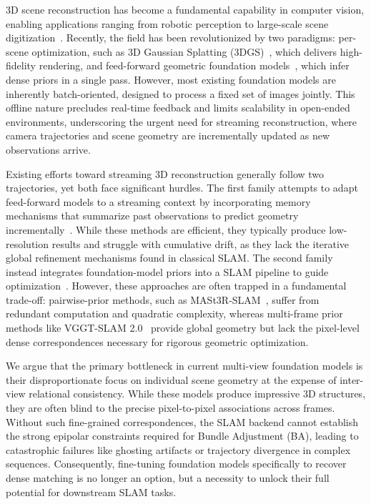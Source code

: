 3D scene reconstruction has become a fundamental capability in computer vision, enabling applications ranging from robotic perception to large-scale scene digitization~\cite{zhou2025hugsim,huang2026soma,yu2026gaussexplorer,yang2025novel}. Recently, the field has been revolutionized by two paradigms: per-scene optimization, such as 3D Gaussian Splatting (3DGS)~\cite{kerbl20233d}, which delivers high-fidelity rendering, and feed-forward geometric foundation models~\cite{leroy2024grounding,wang2025pi,wang2025vggt}, which infer dense priors in a single pass. However, most existing foundation models are inherently batch-oriented, designed to process a fixed set of images jointly. This offline nature precludes real-time feedback and limits scalability in open-ended environments, underscoring the urgent need for streaming reconstruction, where camera trajectories and scene geometry are incrementally updated as new observations arrive.

Existing efforts toward streaming 3D reconstruction generally follow two trajectories, yet both face significant hurdles. The first family attempts to adapt feed-forward models to a streaming context by incorporating memory mechanisms that summarize past observations to predict geometry incrementally~\cite{spann3r,long3r,point3r}. While these methods are efficient, they typically produce low-resolution results and struggle with cumulative drift, as they lack the iterative global refinement mechanisms found in classical SLAM. The second family instead integrates foundation-model priors into a SLAM pipeline to guide optimization~\cite{murai2024_mast3rslam,artdeco,maggio2025vggt}. However, these approaches are often trapped in a fundamental trade-off: pairwise-prior methods, such as MASt3R-SLAM~\cite{murai2024_mast3rslam}, suffer from redundant computation and quadratic complexity, whereas multi-frame prior methods like VGGT-SLAM 2.0~\cite{maggio2026vggt} provide global geometry but lack the pixel-level dense correspondences necessary for rigorous geometric optimization.

We argue that the primary bottleneck in current multi-view foundation models is their disproportionate focus on individual scene geometry at the expense of inter-view relational consistency. While these models produce impressive 3D structures, they are often blind to the precise pixel-to-pixel associations across frames. Without such fine-grained correspondences, the SLAM backend cannot establish the strong epipolar constraints required for Bundle Adjustment (BA), leading to catastrophic failures like ghosting artifacts or trajectory divergence in complex sequences. Consequently, fine-tuning foundation models specifically to recover dense matching is no longer an option, but a necessity to unlock their full potential for downstream SLAM tasks.

